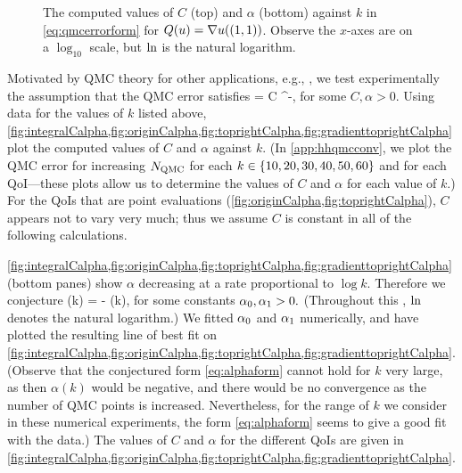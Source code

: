 \begin{figure}[h]
    \centering
    \begin{subfigure}{\textwidth}
            \centering

  \end{subfigure}
    \begin{subfigure}{\textwidth}
            \centering 

    \end{subfigure}
\caption[The computed Quasi-Monte-Carlo convergence rate for $Q(u) =  \gradu(1,1)$.]{The computed values of $C$ (top) and $\alpha$ (bottom) against $k$ in \cref{eq:qmcerrorform} for $Q(u) = \nabla u((1,1))$. Observe the $x$-axes are on a $\log_{10}$ scale, but $\operatorname{ln}$ is the natural logarithm.  \label{fig:gradienttoprightCalpha}}
\end{figure}


Motivated by QMC theory for other applications, e.g., \cite[Equation 4.2]{GrKuNuScSl:11}, we test experimentally the assumption that the QMC error satisfies
\beq\label{eq:qmcerrorform}
 = C \NQMC^{-\alpha},
\eeq
for some $C, \alpha > 0.$ Using data for the values of $k$ listed above, \cref{fig:integralCalpha,fig:originCalpha,fig:toprightCalpha,fig:gradienttoprightCalpha} plot the computed values of $C$ and $\alpha$ against $k$. (In \cref{app:hhqmcconv}, we plot the QMC error for increasing $N_{\mathrm{QMC}}$ for each $k \in \set{10,20,30,40,50,60}$ and for each QoI---these plots allow us to determine the values of $C$ and $\alpha$ for each value of $k.$) For the QoIs that are point evaluations (\cref{fig:originCalpha,fig:toprightCalpha}), $C$ appears not to vary very much; thus we assume $C$ is constant in all of the following calculations.

\cref{fig:integralCalpha,fig:originCalpha,fig:toprightCalpha,fig:gradienttoprightCalpha} (bottom panes) show $\alpha$ decreasing at a rate proportional to $\log k$. Therefore we conjecture
\beq\label{eq:alphaform}
\alpha(k) = \alphaz - \alphao\loge(k),
\eeq
for some constants $\alpha_{0},\alpha_{1} > 0.$ (Throughout this , $\operatorname{ln}$ denotes the natural logarithm.) We fitted $\alpha_{0}$ and $\alpha_{1}$ numerically, and have plotted the resulting line of best fit on \cref{fig:integralCalpha,fig:originCalpha,fig:toprightCalpha,fig:gradienttoprightCalpha}. (Observe that the conjectured form \cref{eq:alphaform} cannot hold for $k$ very large, as then $\alpha(k)$ would be negative, and there would be no convergence as the number of QMC points is increased. Nevertheless, for the range of $k$ we consider in these numerical experiments, the form \cref{eq:alphaform} seems to give a good fit with the data.) The values of $C$ and $\alpha$ for the different QoIs are given in \cref{fig:integralCalpha,fig:originCalpha,fig:toprightCalpha,fig:gradienttoprightCalpha}.

